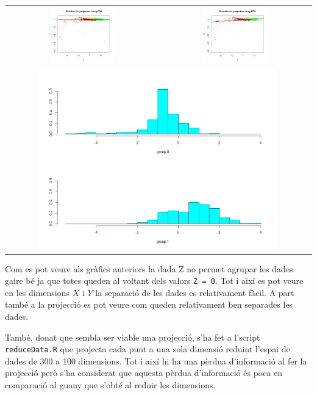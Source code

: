 \documentclass[a4paper]{article}
\begin{document}
\begin{longtable}{cc}
	\includegraphics[width=0.45\textwidth]{images/FDA_YZ} &
	\includegraphics[width=0.45\textwidth]{images/PCA_YZ} \\
	\multicolumn{2}{c}{\includegraphics[width=0.8\textwidth]{images/FDA_results}}
\end{longtable}

Com es pot veure als gràfics anteriors la dada Z no permet agrupar les dades gaire bé ja que totes queden al voltant dels valors \verb|Z = 0|. Tot i així es pot veure en les dimensions $X$ i $Y$ la separació de les dades es relativament fàcil. A part també a la projecció es pot veure com queden relativament ben separades les dades.

També, donat que sembla ser viable una projecció, s'ha fet a l'script \texttt{reduceData.R} que projecta cada punt a una sola dimensió reduint l'espai de dades de 300 a 100 dimensions. Tot i així hi ha una pèrdua d'informació al fer la projecció però s'ha considerat que aquesta pèrdua d'informació és poca en comparació al guany que s'obté al reduir les dimensions.
\end{document}
